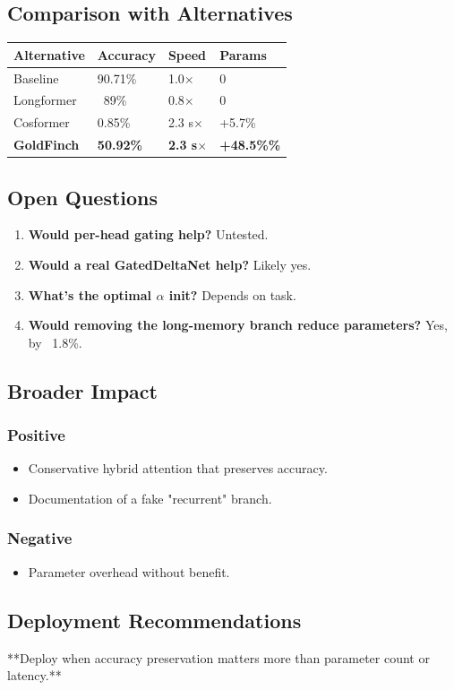 \subsection{Comparison with Alternatives}

\begin{table}[H]
\centering
\small
\begin{tabular}{llll}
\toprule
\textbf{Alternative} & \textbf{Accuracy} & \textbf{Speed} & \textbf{Params} \\
\midrule
Baseline & 90.71\% & 1.0$\times$ & 0 \\
Longformer & ~89\% & 0.8$\times$ & 0 \\
Cosformer & 0.85\% & 2.3 s$\times$ & +5.7\% \\
\textbf{GoldFinch} & \textbf{50.92\%} & \textbf{2.3 s$\times$} & \textbf{+48.5\%\%} \\
\bottomrule
\end{tabular}
\end{table}

\subsection{Open Questions}

\begin{enumerate}
\item \textbf{Would per-head gating help?} Untested.
\item \textbf{Would a real GatedDeltaNet help?} Likely yes.
\item \textbf{What's the optimal $\alpha$ init?} Depends on task.
\item \textbf{Would removing the long-memory branch reduce parameters?} Yes, by ~1.8\%.

\end{enumerate}
\subsection{Broader Impact}

\subsubsection{Positive}

\begin{itemize}
\item Conservative hybrid attention that preserves accuracy.
\item Documentation of a fake "recurrent" branch.

\end{itemize}
\subsubsection{Negative}

\begin{itemize}
\item Parameter overhead without benefit.

\end{itemize}
\subsection{Deployment Recommendations}

**Deploy when accuracy preservation matters more than parameter count or 
latency.**

